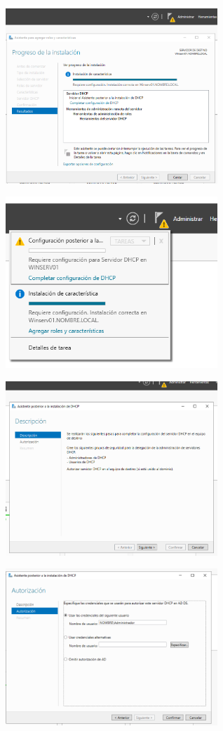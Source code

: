 \documentclass[
  a4paper,
]{article}
\begin{document}
\includegraphics[width=0.6\textwidth,height=\textheight]{png/DHCP2.png}

\includegraphics[width=0.6\textwidth,height=\textheight]{png/DHCP3.png}

\includegraphics[width=0.6\textwidth,height=\textheight]{png/DHCP4.png}

\includegraphics[width=0.6\textwidth,height=\textheight]{png/DHCP5.png}
\end{document}
